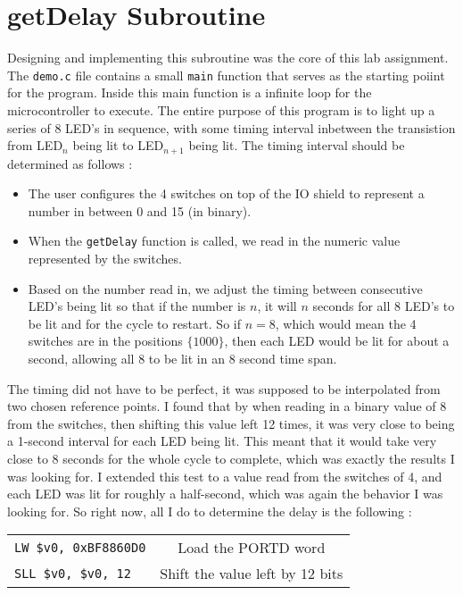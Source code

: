 \documentclass[a4paper,11pt]{article}
\begin{document}
\section{getDelay Subroutine}
Designing and implementing this subroutine was the core of this lab assignment. The \texttt{demo.c} file contains a small \texttt{main} function that serves as the starting poiint for the program. Inside this main function is a infinite loop for the microcontroller to execute. The entire purpose of this program is to light up a series of 8 LED's in sequence, with some timing interval inbetween the transistion from LED$_n$ being lit to LED$_{n+1}$ being lit. The timing interval should be determined as follows :
\begin{itemize}
\item The user configures the 4 switches on top of the IO shield to represent a number in between 0 and 15 (in binary). 
\item When the \texttt{getDelay} function is called, we read in the numeric value represented by the switches.
\item Based on the number read in, we adjust the timing between consecutive LED's being lit so that if the number is $n$, it will $n$ seconds for all 8 LED's to be lit and for the cycle to restart. So if $n = 8$, which would mean the 4 switches are in the positions $\{1 0 0 0 \}$, then each LED would be lit for about a second, allowing all 8 to be lit in an 8 second time span. 
\end{itemize}
The timing did not have to be perfect, it was supposed to be interpolated from two chosen reference points. I found that by when reading in a binary value of 8 from the switches, then shifting this value left 12 times, it was very close to being a 1-second interval for each LED being lit. This meant that it would take very close to 8 seconds for the whole cycle to complete, which was exactly the results I was looking for. I extended this test to a value read from the switches of 4, and each LED was lit for roughly a half-second, which was again the behavior I was looking for. So right now, all I do to determine the delay is the following : \\[.1in]
\begin{tabular}{l | c}
\texttt{LW \$v0, 0xBF8860D0} & Load the PORTD word \\
\texttt{SLL \$v0, \$v0, 12} & Shift the value left by 12 bits \\
\end{tabular}
\end{document}
